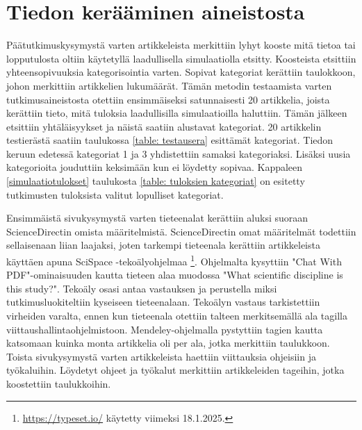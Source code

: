 \documentclass[utf8]{gradu3}
\begin{document}
\section{Tiedon kerääminen aineistosta} \label{aineiston analysointi}
Päätutkimuskysymystä varten artikkeleista merkittiin lyhyt kooste mitä tietoa tai lopputulosta oltiin käytetyllä laadullisella simulaatiolla etsitty. Koosteista etsittiin yhteensopivuuksia kategorisointia varten. Sopivat kategoriat kerättiin taulokkoon, johon merkittiin artikkelien lukumäärät. Tämän metodin testaamista varten tutkimusaineistosta otettiin ensimmäiseksi satunnaisesti 20 artikkelia, joista kerättiin tieto, mitä tuloksia laadullisilla simulaatioilla haluttiin. Tämän jälkeen etsittiin yhtäläisyykset ja näistä saatiin alustavat kategoriat. 20 artikkelin testierästä saatiin taulukossa \ref{table: testausera} esittämät kategoriat. Tiedon keruun edetessä kategoriat 1 ja 3 yhdistettiin samaksi kategoriaksi. Lisäksi uusia kategorioita jouduttiin keksimään kun ei löydetty sopivaa. Kappaleen \ref{simulaatiotulokset} taulukosta \ref{table: tuloksien kategoriat} on esitetty tutkimusten tuloksista valitut lopulliset kategoriat.

Ensimmäistä sivukysymystä varten tieteenalat kerättiin aluksi suoraan ScienceDirectin omista määritelmistä. ScienceDirectin omat määritelmät todettiin sellaisenaan liian laajaksi, joten tarkempi tieteenala kerättiin artikkeleista käyttäen apuna SciSpace -tekoälyohjelmaa \footnote{\url{https://typeset.io/} käytetty viimeksi 18.1.2025.}. 
Ohjelmalta kysyttiin "Chat With PDF"-ominaisuuden 
kautta tieteen alaa muodossa "What scientific discipline is this study?". 
Tekoäly osasi antaa vastauksen ja perustella miksi tutkimusluokiteltiin kyseiseen tieteenalaan.
Tekoälyn vastaus tarkistettiin virheiden varalta, ennen kun tieteenala otettiin talteen
merkitsemällä ala tagilla viittaushallintaohjelmistoon. 
Mendeley-ohjelmalla pystyttiin tagien kautta katsomaan kuinka monta artikkelia oli per ala, jotka merkittiin taulukkoon. Toista sivukysymystä varten artikkeleista haettiin viittauksia ohjeisiin ja työkaluihin. Löydetyt ohjeet ja työkalut merkittiin artikkeleiden tageihin, jotka koostettiin taulukkoihin.
\end{document}

